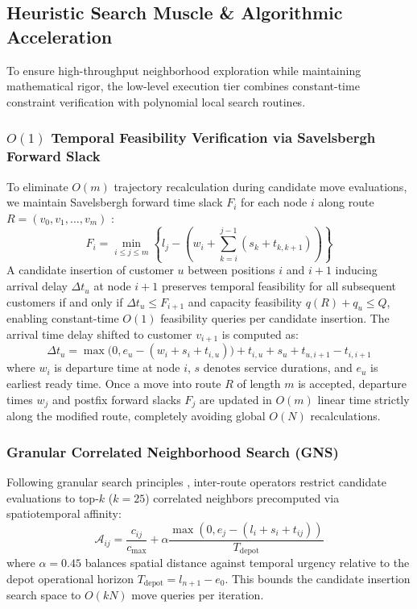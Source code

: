 \documentclass{ieeeaccess}
\begin{document}
\subsection{Heuristic Search Muscle \& Algorithmic Acceleration}
\label{sec:search_muscle}

To ensure high-throughput neighborhood exploration while maintaining mathematical rigor, the low-level execution tier combines constant-time constraint verification with polynomial local search routines.

\subsubsection{\texorpdfstring{$O(1)$}{O(1)} Temporal Feasibility Verification via Savelsbergh Forward Slack}
To eliminate $O(m)$ trajectory recalculation during candidate move evaluations, we maintain Savelsbergh forward time slack $F_i$ for each node $i$ along route $R = (v_0, v_1, \dots, v_m)$ \cite{savelsbergh1992general}:
\begin{equation}
  F_i = \min_{i \le j \le m} \left\{ l_j - \left( w_i + \sum_{k=i}^{j-1} (s_k + t_{k, k+1}) \right) \right\}
  \label{eq:forward_slack}
\end{equation}
A candidate insertion of customer $u$ between positions $i$ and $i+1$ inducing arrival delay $\Delta t_u$ at node $i+1$ preserves temporal feasibility for all subsequent customers if and only if $\Delta t_u \le F_{i+1}$ and capacity feasibility $q(R) + q_u \le Q$, enabling constant-time $O(1)$ feasibility queries per candidate insertion. The arrival time delay shifted to customer $v_{i+1}$ is computed as:
\begin{equation}
  \Delta t_u = \max\bigl(0, e_u - (w_i + s_i + t_{i, u})\bigr) + t_{i, u} + s_u + t_{u, i+1} - t_{i, i+1}
  \label{eq:delta_t_insertion}
\end{equation}
where $w_i$ is departure time at node $i$, $s$ denotes service durations, and $e_u$ is earliest ready time. Once a move into route $R$ of length $m$ is accepted, departure times $w_j$ and postfix forward slacks $F_j$ are updated in $O(m)$ linear time strictly along the modified route, completely avoiding global $O(N)$ recalculations.

\subsubsection{Granular Correlated Neighborhood Search (GNS)}
Following granular search principles \cite{toth2003granular}, inter-route operators restrict candidate evaluations to top-$k$ ($k=25$) correlated neighbors precomputed via spatiotemporal affinity:
\begin{equation}
  \mathcal{A}_{ij} = \frac{c_{ij}}{c_{\max}} + \alpha \frac{\max(0, e_j - (l_i + s_i + t_{ij}))}{T_{\text{depot}}}
  \label{eq:granular_affinity}
\end{equation}
where $\alpha = 0.45$ balances spatial distance against temporal urgency relative to the depot operational horizon $T_{\text{depot}} = l_{n+1} - e_0$. This bounds the candidate insertion search space to $O(k N)$ move queries per iteration.
\end{document}
